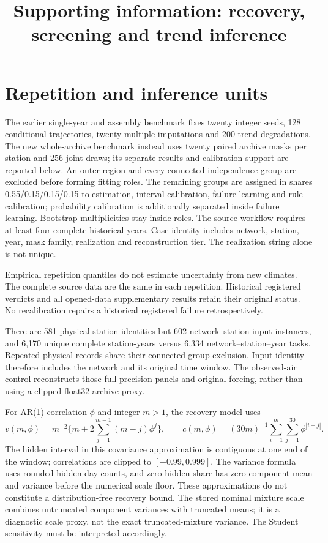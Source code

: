 \documentclass[draft]{agujournal2025}
\begin{document}
\title{Supporting information: recovery, screening and trend inference}
\maketitle\par
\section{Repetition and inference units}
The earlier single-year and assembly benchmark fixes twenty integer seeds, 128 conditional trajectories, twenty multiple imputations and 200 trend degradations. The new whole-archive benchmark instead uses twenty paired archive masks per station and 256 joint draws; its separate results and calibration support are reported below. An outer region and every connected independence group are excluded before forming fitting roles. The remaining groups are assigned in shares 0.55/0.15/0.15/0.15 to estimation, interval calibration, failure learning and rule calibration; probability calibration is additionally separated inside failure learning. Bootstrap multiplicities stay inside roles. The source workflow requires at least four complete historical years. Case identity includes network, station, year, mask family, realization and reconstruction tier. The realization string alone is not unique.

Empirical repetition quantiles do not estimate uncertainty from new climates. The complete source data are the same in each repetition. Historical registered verdicts and all opened-data supplementary results retain their original status. No recalibration repairs a historical registered failure retrospectively.

There are 581 physical station identities but 602 network--station input instances, and 6,170 unique complete station-years versus 6,334 network--station--year tasks. Repeated physical records share their connected-group exclusion. Input identity therefore includes the network and its original time window. The observed-air control reconstructs those full-precision panels and original forcing, rather than using a clipped float32 archive proxy.

For AR(1) correlation $\phi$ and integer $m>1$, the recovery model uses
\[
v(m,\phi)=m^{-2}\{m+2\sum_{j=1}^{m-1}(m-j)\phi^j\},\qquad
c(m,\phi)=(30m)^{-1}\sum_{i=1}^{m}\sum_{j=1}^{30}\phi^{|i-j|}.
\]
The hidden interval in this covariance approximation is contiguous at one end of the window; correlations are clipped to $[-0.99,0.999]$. The variance formula uses rounded hidden-day counts, and zero hidden share has zero component mean and variance before the numerical scale floor. These approximations do not constitute a distribution-free recovery bound. The stored nominal mixture scale combines untruncated component variances with truncated means; it is a diagnostic scale proxy, not the exact truncated-mixture variance. The Student sensitivity must be interpreted accordingly.
\end{document}
